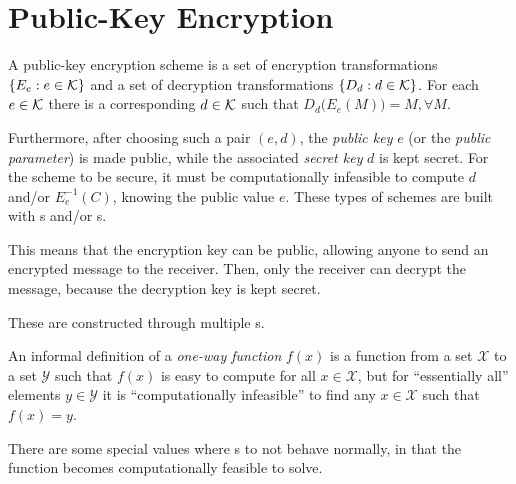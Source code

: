 \section{Public-Key Encryption}\label{sec:Public_Key_Encryption}
\begin{definition}\label{def:Public_Key_Encryption_Scheme}
  A public-key encryption scheme is a set of encryption transformations $\lbrace E_{e} : e \in \operatorname{\mathcal{K}} \rbrace$ and a set of decryption transformations $\lbrace D_{d} : d \in \operatorname{\mathcal{K}} \rbrace$.
  For each $e \in \operatorname{\mathcal{K}}$ there is a corresponding $d \in \operatorname{\mathcal{K}}$ such that $D_{d} \bigl(E_{e} (M) \bigr) = M,  \forall M$.

  Furthermore, after choosing such a pair $(e, d)$, the \emph{public key} $e$ (or the \emph{public parameter}) is made public, while the associated \emph{secret key} $d$ is kept secret.
  For the scheme to be secure, it must be computationally infeasible to compute $d$ and/or $E_{e}^{-1}(C)$, knowing the public value $e$.
  These types of schemes are built with s and/or s.

  This means that the encryption key can be public, allowing anyone to send an encrypted message to the receiver.
  Then, only the receiver can decrypt the message, because the decryption key is kept secret.

  \begin{remark}[Construction]
    These are constructed through multiple s.
  \end{remark}
\end{definition}

\begin{definition}\label{def:One_Way_Function}
  An informal definition of a \emph{one-way function} $f(x)$ is a function from a set $\mathcal{X}$ to a set $\mathcal{Y}$ such that $f(x)$ is easy to compute for all $x \in \mathcal{X}$, but for ``essentially all'' elements $y \in \mathcal{Y}$ it is ``computationally infeasible'' to find any $x \in \mathcal{X}$ such that $f(x) = y$.

  \begin{remark}\label{rmk:One_Way_Function-Essentially_All}
    There are some special values where s to not behave normally, in that the function becomes computationally feasible to solve.
  \end{remark}
\end{definition}

